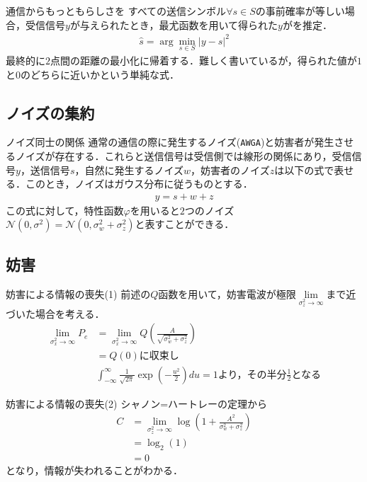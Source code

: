 \documentclass[11pt, aspectratio=169]{beamer}
\begin{document}
\begin{frame}{通信からもっともらしさを}
  すべての送信シンボル$\forall s \in S$の事前確率が等しい場合，受信信号$y$が与えられたとき，最尤函数を用いて得られた$y$がを推定．
  \begin{align*}
    \hat{s} = \arg \min \limits_{s \in S} |y - s| ^2
  \end{align*}
  最終的に$2$点間の距離の最小化に帰着する．難しく書いているが，得られた値が$1$と$0$のどちらに近いかという単純な式．
\end{frame}

\subsection{ノイズの集約}

\begin{frame}{ノイズ同士の関係}
  通常の通信の際に発生するノイズ(\texttt{AWGA})と妨害者が発生させるノイズが存在する．これらと送信信号は受信側では線形の関係にあり，受信信号$y$，送信信号$s$，自然に発生するノイズ$w$，妨害者のノイズ$z$は以下の式で表せる．このとき，ノイズはガウス分布に従うものとする．
  \begin{align*}
    y = s + w + z
  \end{align*}
  この式に対して，特性函数$\varphi$を用いると$2$つのノイズ$\mathcal{N}(0, \sigma^2) = \mathcal{N}(0, \sigma_w^2 + \sigma_z^2)$と表すことができる．
\end{frame}

\subsection{妨害}

\begin{frame}{妨害による情報の喪失(1)}
  前述の$Q$函数を用いて，妨害電波が極限$\lim \limits_{\sigma_z^2 \rightarrow \infty}$まで近づいた場合を考える．
  \begin{align*}
    \lim \limits_{\sigma_x^2 \rightarrow \infty} P_e &= \lim \limits_{\sigma_x^2 \rightarrow \infty} Q \left( \frac{A}{\sqrt{\sigma_w^2 + \sigma_z^2}} \right) \\
    &= Q(0) \text{に収束し} \\
    & \int_{- \infty}^{\infty} \frac{1}{\sqrt{2 \pi}} \exp \left( - \frac{u^2}{2}\right) du = 1 \text{より，その半分}\frac{1}{2}\text{となる}
  \end{align*}
\end{frame}

\begin{frame}{妨害による情報の喪失(2)}
  シャノン=ハートレーの定理から
  \begin{align*}
    C &= \lim \limits_{\sigma_z^2 \rightarrow \infty} \log \left(1 + \frac{A^2}{\sigma_w^2 + \sigma_z^2} \right) \\
    &= \log_2(1) \\
    &= 0
  \end{align*}
  となり，情報が失われることがわかる．
\end{frame}
\end{document}
